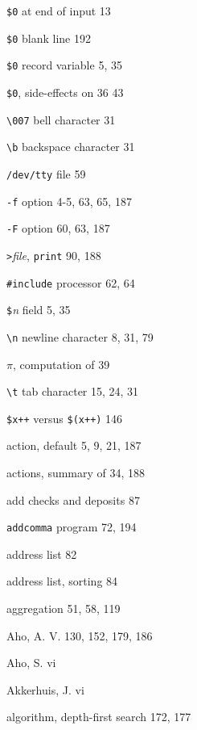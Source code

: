 \begin{multicols}{3}
\hangindent=4pc  \verb'$0' at end of input 13

\hangindent=4pc  \verb'$0' blank line 192

\hangindent=4pc  \verb'$0' record variable 5, 35

\hangindent=4pc  \verb'$0', side-effects on 36 43

\hangindent=4pc  \verb'\007' bell character 31

\hangindent=4pc  \verb'\b' backspace character 31

\hangindent=4pc  \verb'/dev/tty' file 59

\hangindent=4pc  \verb'-f' option 4-5, 63, 65, 187

\hangindent=4pc  \verb'-F' option 60, 63, 187

\hangindent=4pc  \verb'>'\textit{file}, \verb'print' 90, 188

\hangindent=4pc  \verb'#include' processor 62, 64

\hangindent=4pc  \verb'$'\textit{n} field 5, 35

\hangindent=4pc  \verb'\n' newline character 8, 31, 79

\hangindent=4pc  $\pi$, computation of 39

\hangindent=4pc  \verb'\t' tab character 15, 24, 31

\hangindent=4pc  \verb'$x++' versus \verb'$(x++)' 146

\hangindent=4pc  action, default 5, 9, 21, 187

\hangindent=4pc  actions, summary of 34, 188

\hangindent=4pc  add checks and deposits 87

\hangindent=4pc  \verb'addcomma' program 72, 194

\hangindent=4pc  address list 82

\hangindent=4pc  address list, sorting 84

\hangindent=4pc  aggregation 51, 58, 119

\hangindent=4pc  Aho, A. V. 130, 152, 179, 186

\hangindent=4pc  Aho, S. vi

\hangindent=4pc  Akkerhuis, J. vi

\hangindent=4pc  algorithm, depth-first search 172, 177


\end{multicols}

